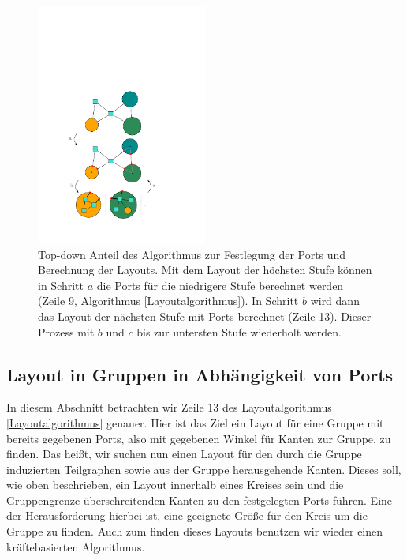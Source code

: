 \begin{figure}[h!]
\begin{center} 
  \includegraphics[width=0.5\textwidth]{Pics/TopDown.pdf}
  \caption{Top-down Anteil des Algorithmus zur Festlegung der Ports und Berechnung der Layouts.
  Mit dem Layout der höchsten Stufe können in Schritt $a$ die Ports für die niedrigere Stufe berechnet werden (Zeile 9, Algorithmus \ref{Layoutalgorithmus}).
  In Schritt $b$ wird dann das Layout der nächsten Stufe mit Ports berechnet (Zeile 13).
  Dieser Prozess mit $b$ und $c$ bis zur untersten Stufe wiederholt werden. }
  \label{f:TopDown}
\end{center}
\end{figure}


\subsection{Layout in Gruppen in Abhängigkeit von Ports}
In diesem Abschnitt betrachten wir Zeile 13 des Layoutalgorithmus \ref{Layoutalgorithmus} genauer. 
Hier ist das Ziel ein Layout für eine Gruppe mit bereits gegebenen Ports, also mit gegebenen Winkel für Kanten zur Gruppe, zu finden.
Das heißt, wir suchen nun einen Layout für den durch die Gruppe induzierten Teilgraphen sowie aus der Gruppe herausgehende Kanten.
Dieses soll, wie oben beschrieben, ein Layout innerhalb eines Kreises sein und die Gruppengrenze-überschreitenden Kanten zu den festgelegten Ports führen.
Eine der Herausforderung hierbei ist, eine geeignete Größe für den Kreis um die Gruppe zu finden. Auch zum finden dieses Layouts benutzen wir wieder einen kräftebasierten Algorithmus.

